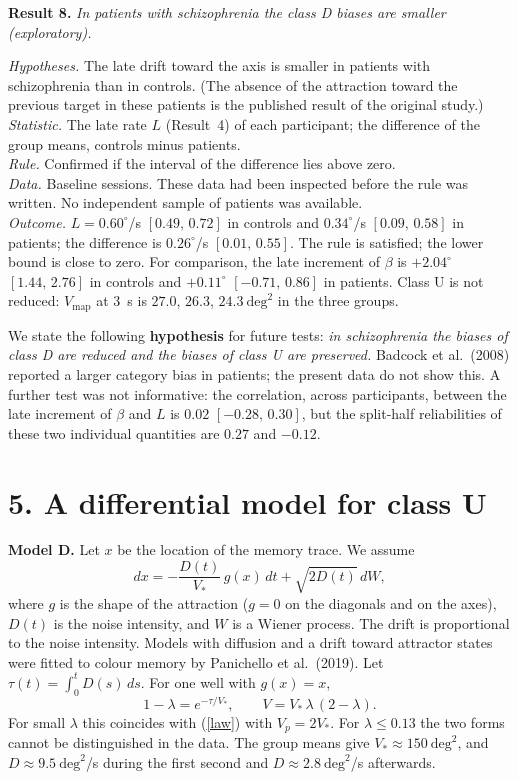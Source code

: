 \documentclass[10pt,a4paper]{article}
\newcommand{\dg}{^{\circ}}
\newcommand{\ci}[2]{$[#1,\,#2]$}
\newcommand{\dsq}{\mathrm{deg}^2}
\newcommand{\res}[1]{\textbf{Result #1.}}
\newcommand{\hyp}{\emph{Hypotheses.} }
\newcommand{\stat}{\emph{Statistic.} }
\newcommand{\rul}{\emph{Rule.} }
\newcommand{\dat}{\emph{Data.} }
\newcommand{\outc}{\emph{Outcome.} }
\begin{document}
\res{8} \emph{In patients with schizophrenia the class D biases are smaller (exploratory).}

\hyp The late drift toward the axis is smaller in patients with schizophrenia than in controls. (The absence
of the attraction toward the previous target in these patients is the published result of the original
study.)\\
\stat The late rate $L$ (Result~4) of each participant; the difference of the group means, controls minus
patients.\\
\rul Confirmed if the interval of the difference lies above zero.\\
\dat Baseline sessions. These data had been inspected before the rule was written. No independent sample of
patients was available.\\
\outc $L=0.60\dg$/s \ci{0.49}{0.72} in controls and $0.34\dg$/s \ci{0.09}{0.58} in patients; the difference
is $0.26\dg$/s \ci{0.01}{0.55}. The rule is satisfied; the lower bound is close to zero. For comparison, the
late increment of $\beta$ is $+2.04\dg$ \ci{1.44}{2.76} in controls and $+0.11\dg$ \ci{-0.71}{0.86} in
patients. Class U is not reduced: $V_{\mathrm{map}}$ at $3$~s is $27.0$, $26.3$, $24.3~\dsq$ in the three
groups.

We state the following \textbf{hypothesis} for future tests: \emph{in schizophrenia the biases of class D are
reduced and the biases of class U are preserved.} Badcock et al.\ (2008) reported a larger category bias in
patients; the present data do not show this. A further test was not informative: the correlation, across participants,
between the late increment of $\beta$ and $L$ is $0.02$ \ci{-0.28}{0.30}, but the split-half reliabilities
of these two individual quantities are $0.27$ and $-0.12$.

\section*{5. A differential model for class U}

\textbf{Model D.} Let $x$ be the location of the memory trace. We assume
\begin{equation}
dx=-\frac{D(t)}{V_*}\,g(x)\,dt+\sqrt{2D(t)}\,dW ,
\label{sde}
\end{equation}
where $g$ is the shape of the attraction ($g=0$ on the diagonals and on the axes), $D(t)$ is the noise
intensity, and $W$ is a Wiener process. The drift is proportional to the noise intensity. Models with diffusion and a drift toward attractor
states were fitted to colour memory by Panichello et al.\ (2019). Let $\tau(t)=\int_0^tD(s)\,ds$. For one well with $g(x)=x$,
\begin{equation}
1-\lambda=e^{-\tau/V_*},\qquad V=V_*\,\lambda\,(2-\lambda).
\end{equation}
For small $\lambda$ this coincides with (\ref{law}) with $V_p=2V_*$. For $\lambda\le0.13$ the two forms
cannot be distinguished in the data. The group means give $V_*\approx150~\dsq$, and $D\approx9.5~\dsq$/s
during the first second and $D\approx2.8~\dsq$/s afterwards.
\end{document}
